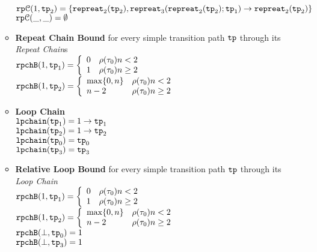 \begin{enumerate}
\begin{itemize}
      \\
      $\mathtt{rp}\mathcal{C}(1, \mathtt{tp}_2) = \{\mathtt{repreat}_2(\mathtt{tp}_2), \mathtt{repreat}_3(\mathtt{repreat}_2(\mathtt{tp}_2); \mathtt{tp}_1) \to \mathtt{repreat}_2(\mathtt{tp}_2)\}$ \\
      $\mathtt{rp}\mathcal{C}(\_, \_) = \emptyset$ 
      \item \textbf{Repeat Chain Bound} for every simple transition path $\mathtt{tp}$ through its \emph{Repeat Chain}s
      \\
      $\rpchB(1, \tpath_1) = 
      \left\{
        \begin{array}{ll}
        0 & \env(\trace_0)  n < 2 \\
        1 & \env(\trace_0)  n \geq 2
        \end{array} 
      \right.$
      \\
      $\rpchB(1, \tpath_2) =     
      \left\{
        \begin{array}{ll}
        \max\{0, n\} & \env(\trace_0) n < 2 \\
        n - 2 & \env(\trace_0)  n \geq 2
        \end{array} 
      \right.$
      \item \textbf{Loop Chain}
      \\
      $\mathtt{lpchain}(\mathtt{tp}_1) = 1\to \mathtt{tp}_1$ \\
      $\mathtt{lpchain}(\mathtt{tp}_2) = 1\to \mathtt{tp}_2$ \\
      $\mathtt{lpchain}(\mathtt{tp}_0) = \mathtt{tp}_0$ \\
      $\mathtt{lpchain}(\mathtt{tp}_3) = \mathtt{tp}_3$ 
      \item \textbf{{Relative Loop Bound}} for every simple transition path $\mathtt{tp}$ through its \emph{Loop Chain}
      \\
      $\rpchB(1, \tpath_1) =       
      \left\{
        \begin{array}{ll}
        0 & \env(\trace_0)  n < 2 \\
        1 & \env(\trace_0)  n \geq 2
        \end{array} 
      \right.$
      \\
      $\rpchB(1, \tpath_2) = 
      \left\{
        \begin{array}{ll}
        \max\{0, n\} & \env(\trace_0) n < 2 \\
        n - 2 & \env(\trace_0)  n \geq 2
        \end{array} 
      \right.$
       \\
      $\mathtt{rpchB}(\bot, \mathtt{tp}_0) = 1$ \\
      $\mathtt{rpchB}(\bot, \mathtt{tp}_3) = 1$ 

\end{itemize}
\end{enumerate}
